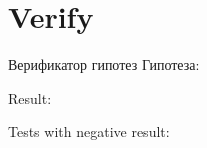\section{Verify}
\begin{frame}{Верификатор гипотез}
	Гипотеза:


	Result:


	Tests with negative result:


\end{frame}


